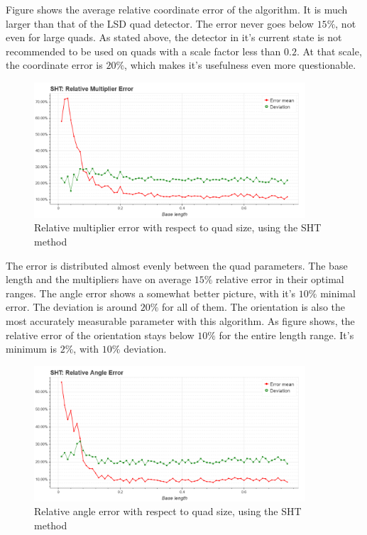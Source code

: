 Figure  shows the average relative coordinate error of the algorithm.
It is much larger than that of the LSD quad detector.
The error never goes below $15\%$, not even for large quads.
As stated above, the detector in it's current state is not recommended to be used on quads with a scale factor less than $0.2$.
At that scale, the coordinate error is $20\%$, which makes it's usefulness even more questionable.
\begin{figure}[ht]
	\centering
	\includegraphics[width=0.9\textwidth]{figures/plots/sht_relative_multiplier_error.png}
	\caption{Relative multiplier error with respect to quad size, using the SHT method}
	\label{fig:shtRelMulErr}
\end{figure}

The error is distributed almost evenly between the quad parameters.
The base length and the multipliers have on average $15\%$ relative error in their optimal ranges.
The angle error shows a somewhat better picture, with it's $10\%$ minimal error.
The deviation is around $20\%$ for all of them.
The orientation is also the most accurately measurable parameter with this algorithm.
As figure  shows, the relative error of the orientation stays below $10\%$ for the entire length range.
It's minimum is $2\%$, with $10\%$ deviation.
\begin{figure}[ht]
	\centering
	\includegraphics[width=0.9\textwidth]{figures/plots/sht_relative_angle_error.png}
	\caption{Relative angle error with respect to quad size, using the SHT method}
	\label{fig:shtRelAngleErr}
\end{figure}

